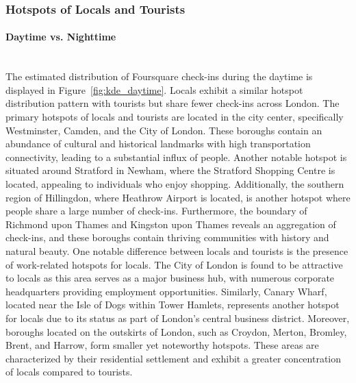 \documentclass{article}
\newcommand{\subsubsubsection}[1]{\paragraph{#1}\mbox{}\\}
\theoremstyle{definition}
\theoremstyle{remark}
\begin{document}
\subsubsection{Hotspots of Locals and Tourists} \label{hotspots}

\subsubsubsection{Daytime vs. Nighttime}
The estimated distribution of Foursquare check-ins during the daytime is displayed in Figure~\ref{fig:kde_daytime}. Locals exhibit a similar hotspot distribution pattern with tourists but share fewer check-ins across London. The primary hotspots of locals and tourists are located in the city center, specifically Westminster, Camden, and the City of London. These boroughs contain an abundance of cultural and historical landmarks with high transportation connectivity, leading to a substantial influx of people. Another notable hotspot is situated around Stratford in Newham, where the Stratford Shopping Centre is located, appealing to individuals who enjoy shopping. Additionally, the southern region of Hillingdon, where Heathrow Airport is located, is another hotspot where people share a large number of check-ins. Furthermore, the boundary of Richmond upon Thames and Kingston upon Thames reveals an aggregation of check-ins, and these boroughs contain thriving communities with history and natural beauty. One notable difference between locals and tourists is the presence of work-related hotspots for locals. The City of London is found to be attractive to locals as this area serves as a major business hub, with numerous corporate headquarters providing employment opportunities. Similarly, Canary Wharf, located near the Isle of Dogs within Tower Hamlets, represents another hotspot for locals due to its status as part of London's central business district. Moreover, boroughs located on the outskirts of London, such as Croydon, Merton, Bromley, Brent, and Harrow, form smaller yet noteworthy hotspots. These areas are characterized by their residential settlement and exhibit a greater concentration of locals compared to tourists.
\end{document}
